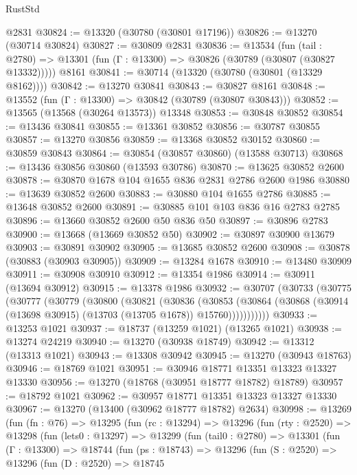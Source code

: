 \begin{lexlean}{RustStd}
\begin{coremodule}
    @2831
@30824 := @13320 (@30780 (@30801 @17196))
@30826 := @13270 (@30714 @30824)
@30827 := @30809 @2831
@30836 := @13534
    (fun (tail : @2780) => @13301 (fun (Γ : @13300) => @30826 (@30789 (@30807 (@30827 @13332)))))
    @8161
@30841 := @30714 (@13320 (@30780 (@30801 (@13329 @8162))))
@30842 := @13270 @30841
@30843 := @30827 @8161
@30848 := @13552 (fun (Γ : @13300) => @30842 (@30789 (@30807 @30843)))
@30852 := @13565 (@13568 (@30264 @13573)) @13348
@30853 := @30848 @30852
@30854 := @13436 @30841
@30855 := @13361 @30852
@30856 := @30787 @30855
@30857 := @13270 @30856
@30859 := @13368 @30852 @30152
@30860 := @30859 @30843
@30864 := @30854 (@30857 @30860) (@13588 @30713)
@30868 := @13436 @30856 @30860 (@13593 @30786)
@30870 := @13625 @30852 @2600
@30878 := @30870 @1678 @104 @1655 @836 @2831 @2786 @2600 @1986
@30880 := @13639 @30852 @2600
@30883 := @30880 @104 @1655 @2786
@30885 := @13648 @30852 @2600
@30891 := @30885 @101 @103 @836 @16 @2783 @2785
@30896 := @13660 @30852 @2600 @50 @836 @50
@30897 := @30896 @2783
@30900 := @13668 (@13669 @30852 @50)
@30902 := @30897 @30900 @13679
@30903 := @30891 @30902
@30905 := @13685 @30852 @2600
@30908 := @30878 (@30883 (@30903 @30905))
@30909 := @13284 @1678
@30910 := @13480 @30909
@30911 := @30908 @30910
@30912 := @13354 @1986
@30914 := @30911 (@13694 @30912)
@30915 := @13378 @1986
@30932 := @30707
    (@30733
      (@30775
        (@30777
          (@30779
            (@30800
              (@30821
                (@30836
                  (@30853
                    (@30864
                      (@30868 (@30914 (@13698 @30915) (@13703 (@13705 @1678)) @15760)))))))))))
@30933 := @13253 @1021
@30937 := @18737 (@13259 @1021) (@13265 @1021)
@30938 := @13274 @24219
@30940 := @13270 (@30938 @18749)
@30942 := @13312 (@13313 @1021)
@30943 := @13308 @30942
@30945 := @13270 (@30943 @18763)
@30946 := @18769 @1021
@30951 := @30946 @18771 @13351 @13323 @13327 @13330
@30956 := @13270 (@18768 (@30951 @18777 @18782) @18789)
@30957 := @18792 @1021
@30962 := @30957 @18771 @13351 @13323 @13327 @13330
@30967 := @13270 (@13400 (@30962 @18777 @18782) @2634)
@30998 := @13269
    (fun (fn : @76) =>
    @13295
      (fun (rc : @13294) =>
      @13296
        (fun (rty : @2520) =>
        @13298
          (fun (lets0 : @13297) =>
          @13299
            (fun (tail0 : @2780) =>
            @13301
              (fun (Γ : @13300) =>
              @18744
                (fun (ps : @18743) =>
                @13296
                  (fun (S : @2520) =>
                  @13296
                    (fun (D : @2520) =>
                    @18745

\end{coremodule}
\end{lexlean}

